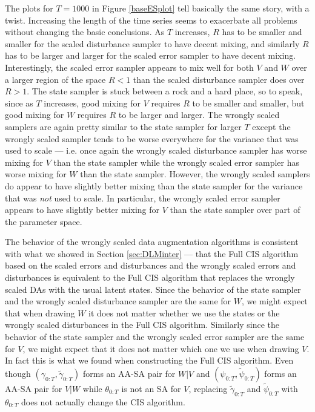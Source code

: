 \documentclass{article}
\begin{document}
The plots for $T=1000$ in Figure \ref{baseESplot} tell basically the same story, with a twist. Increasing the length of the time series seems to exacerbate all problems without changing the basic conclusions. As $T$ increases, $R$ has to be smaller and smaller for the scaled disturbance sampler to have decent mixing, and similarly $R$ has to be larger and larger for the scaled error sampler to have decent mixing. Interestingly, the scaled error sampler appears to mix well for both $V$ and $W$ over a larger region of the space $R<1$ than the scaled disturbance sampler does over $R>1$. The state sampler is stuck between a rock and a hard place, so to speak, since as $T$ increases, good mixing for $V$ requires $R$ to be smaller and smaller, but good mixing for $W$ requires $R$ to be larger and larger. The wrongly scaled samplers are again pretty similar to the state sampler for larger $T$ except the wrongly scaled sampler tends to be worse everywhere for the variance that was used to scale --- i.e. once again the wrongly scaled disturbance sampler has worse mixing for $V$ than the state sampler while the wrongly scaled error sampler has worse mixing for $W$ than the state sampler. However, the wrongly scaled samplers do appear to have slightly better mixing than the state sampler for the variance that was {\it not} used to scale. In particular, the wrongly scaled error sampler appears to have slightly better mixing for $V$ than the state sampler over part of the parameter space. 

The behavior of the wrongly scaled data augmentation algorithms is consistent with what we showed in Section \ref{sec:DLMinter} --- that the Full CIS algorithm based on the scaled errors and disturbances and the wrongly scaled errors and disturbances is equivalent to the Full CIS algorithm that replaces the wrongly scaled DAs with the usual latent states. Since the behavior of the state sampler and the wrongly scaled disturbance sampler are the same for $W$, we might expect that when drawing $W$ it does not matter whether we use the states or the wrongly scaled disturbances in the Full CIS algorithm. Similarly since the behavior of the state sampler and the wrongly scaled error sampler are the same for $V$, we might expect that it does not matter which one we use when drawing $V$. In fact this is what we found when constructing the Full CIS algorithm. Even though $(\gamma_{0:T}, \tilde{\gamma}_{0:T})$ forms an AA-SA pair for $W|V$ and $(\psi_{0:T},\tilde{\psi}_{0:T})$ forms an AA-SA pair for $V|W$ while $\theta_{0:T}$ is not an SA for $V$, replacing $\tilde{\gamma}_{0:T}$ and $\tilde{\psi}_{0:T}$ with $\theta_{0:T}$ does not actually change the CIS algorithm.
\end{document}
